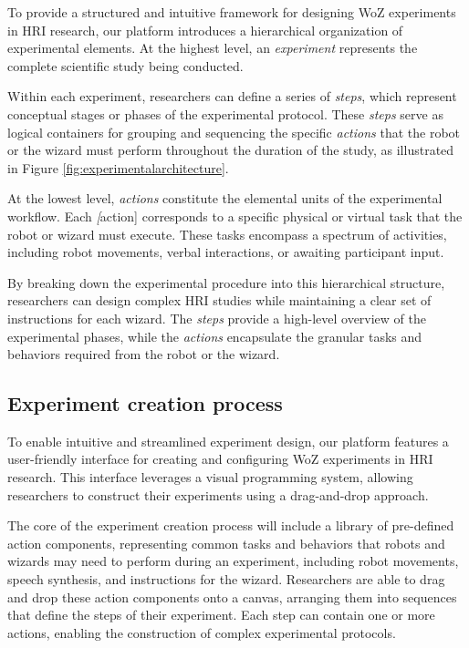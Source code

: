 \documentclass[letterpaper, 10 pt, conference]{ieeeconf}
\begin{document}
To provide a structured and intuitive framework for designing WoZ experiments in HRI research, our platform introduces a hierarchical organization of experimental elements. At the highest level, an \textit{experiment} represents the complete scientific study being conducted. 

Within each experiment, researchers can define a series of \textit{steps}, which represent conceptual stages or phases of the experimental protocol. These \textit{steps} serve as logical containers for grouping and sequencing the specific \textit{actions} that the robot or the wizard must perform throughout the duration of the study, as illustrated in Figure \ref{fig:experimentalarchitecture}.

At the lowest level, \textit{actions} constitute the elemental units of the experimental workflow. Each \textit[action] corresponds to a specific physical or virtual task that the robot or wizard must execute. These tasks encompass a spectrum of activities, including robot movements, verbal interactions, or awaiting participant input.

By breaking down the experimental procedure into this hierarchical structure, researchers can design complex HRI studies while maintaining a clear set of instructions for each wizard. The \textit{steps} provide a high-level overview of the experimental phases, while the \textit{actions} encapsulate the granular tasks and behaviors required from the robot or the wizard.

\subsection{Experiment creation process} 

To enable intuitive and streamlined experiment design, our platform features a user-friendly interface for creating and configuring WoZ experiments in HRI research. This interface leverages a visual programming system, allowing researchers to construct their experiments using a drag-and-drop approach.

The core of the experiment creation process will include a library of pre-defined action components, representing common tasks and behaviors that robots and wizards may need to perform during an experiment, including robot movements, speech synthesis, and instructions for the wizard. Researchers are able to drag and drop these action components onto a canvas, arranging them into sequences that define the steps of their experiment. Each step can contain one or more actions, enabling the construction of complex experimental protocols.
\end{document}
